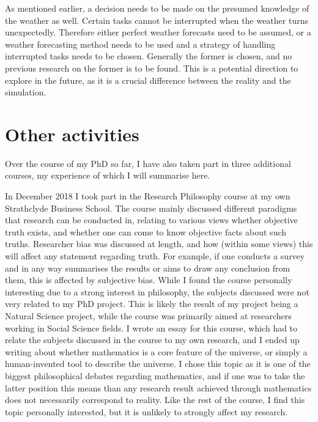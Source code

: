 \documentclass[a4paper,12pt]{article}
\begin{document}
As mentioned earlier, a decision needs to be made on the presumed knowledge of the weather as well. Certain tasks cannot be interrupted when the weather turns unexpectedly. Therefore either perfect weather forecasts need to be assumed, or a weather forecasting method needs to be used and a strategy of handling interrupted tasks needs to be chosen. Generally the former is chosen, and no previous research on the former is to be found. This is a potential direction to explore in the future, as it is a crucial difference between the reality and the simulation. 


\pagebreak

\section{Other activities} \label{s:otact}
Over the course of my PhD so far, I have also taken part in three additional courses, my experience of which I will summarise here. 

\bigskip

In December 2018 I took part in the Research Philosophy course at my own Strathclyde Business School. The course mainly discussed different paradigms that research can be conducted in, relating to various views whether objective truth exists, and whether one can come to know objective facts about such truths. Researcher bias was discussed at length, and how (within some views) this will affect any statement regarding truth. For example, if one conducts a survey and in any way summarises the results or aims to draw any conclusion from them, this is affected by subjective bias. While I found the course personally interesting due to a strong interest in philosophy, the subjects discussed were not very related to my PhD project. This is likely the result of my project being a Natural Science project, while the course was primarily aimed at researchers working in Social Science fields. I wrote an essay for this course, which had to relate the subjects discussed in the course to my own research, and I ended up writing about whether mathematics is a core feature of the universe, or simply a human-invented tool to describe the universe. I chose this topic as it is one of the biggest philosophical debates regarding mathematics, and if one was to take the latter position this means than any research result achieved through mathematics does not necessarily correspond to reality. Like the rest of the course, I find this topic personally interested, but it is unlikely to strongly affect my research. 
\end{document}
